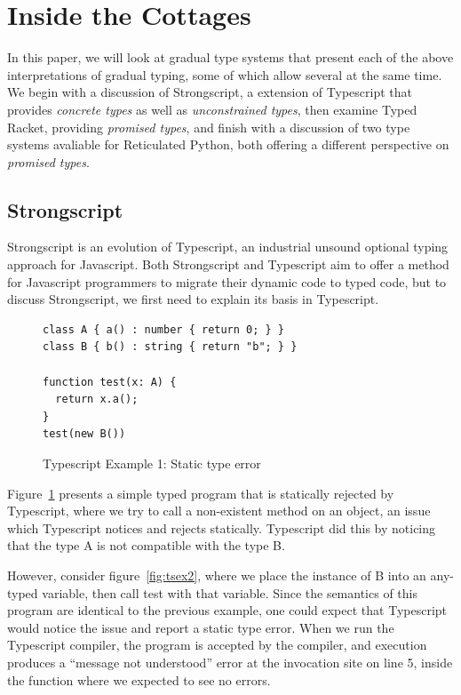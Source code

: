 \documentclass[a4paper,USenglish]{tex/lipics-v2016}
\begin{document}
\section{Inside the Cottages}

In this paper, we will look at gradual type systems that present each of the
above interpretations of gradual typing, some of which allow several at the 
same time. We begin with a discussion of Strongscript, a extension of Typescript
that provides \emph{concrete types} as well as \emph{unconstrained types}, then
examine Typed Racket, providing \emph{promised types}, and finish with a
discussion of two type systems avaliable for Reticulated Python, both offering
a different perspective on \emph{promised types}. 

\subsection{Strongscript}

Strongscript is an evolution of Typescript, an industrial unsound optional
typing approach for Javascript. Both Strongscript and Typescript aim to
offer a method for Javascript programmers to migrate their dynamic code
to typed code, but to discuss Strongscript, we first need to explain its 
basis in Typescript.

\begin{figure}[h]
\begin{verbatim}
class A { a() : number { return 0; } }
class B { b() : string { return "b"; } }

function test(x: A) {
  return x.a();
}
test(new B())
\end{verbatim}
\caption{Typescript Example 1: Static type error}
\label{fig:tsex1}
\end{figure}

Figure~\ref{fig:tsex1} presents a simple typed program that is statically 
rejected by Typescript, where we try to call a non-existent method on an object,
an issue which Typescript notices and rejects statically. Typescript did this
by noticing that the type A is not compatible with the type B.

However, consider figure~\ref{fig:tsex2}, where we place the instance of B
into an any-typed variable, then call test with that variable. Since the
semantics of this program are identical to the previous example, one could
expect that Typescript would notice the issue and report a static type
error. When we run the Typescript compiler, the program is accepted by the
compiler, and execution produces a ``message not understood'' error at the
invocation site on line 5, inside the function where we expected to see no
errors.
\end{document}
